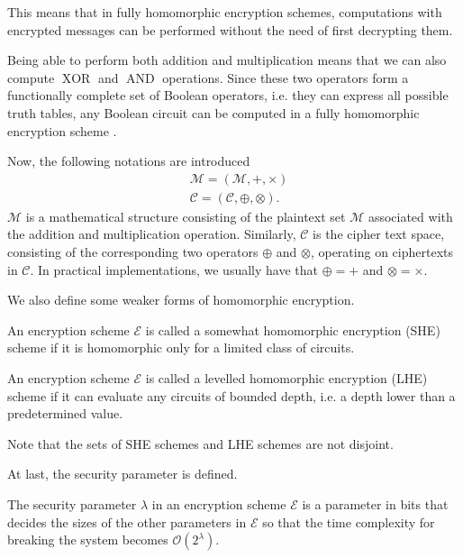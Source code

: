 This means that in fully homomorphic encryption schemes, computations with encrypted messages can be performed without the need of first decrypting them.

Being able to perform both addition and multiplication means that we can also compute $\operatorname{XOR}$ and $\operatorname{AND}$ operations. Since these two operators form a functionally complete set of Boolean operators, i.e. they can express all possible truth tables, any Boolean circuit can be computed in a fully homomorphic encryption scheme \cite{cite:QianFHE}.

Now, the following notations are introduced
\begin{align*} 
& \mathscr{M} = (\mathcal{M}, +, \times) \\
& \mathscr{C} = (\mathcal{C}, \oplus, \otimes).
\end{align*}
$\mathscr{M}$ is a mathematical structure consisting of the plaintext set $\mathcal{M}$ associated with the addition and multiplication operation. Similarly, $\mathscr{C}$ is the cipher text space, consisting of the corresponding two operators $\oplus$ and $\otimes$, operating on ciphertexts in $\mathcal{C}$. In practical implementations, we usually have that $\oplus = +$ and $\otimes = \times $.

We also define some weaker forms of homomorphic encryption.
\begin{definition}\label{def:she}
An encryption scheme $\mathcal{E}$ is called a somewhat homomorphic encryption (SHE) scheme if it is homomorphic only for a limited class of circuits.
\end{definition}
\begin{definition}\label{def:lhe}
An encryption scheme $\mathcal{E}$ is called a levelled homomorphic encryption (LHE) scheme if it can evaluate any circuits of bounded depth, i.e. a depth lower than a predetermined value.
\end{definition}

Note that the sets of SHE schemes and LHE schemes are not disjoint.


At last, the security parameter is defined.
\begin{definition}\label{def:security_parameter}
The security parameter $\lambda$ in an encryption scheme $\mathcal{E}$ is a parameter in bits that decides the sizes of the other parameters in $\mathcal{E}$ so that the time complexity for breaking the system becomes $\mathcal{O}(2^{\lambda})$.
\end{definition}


